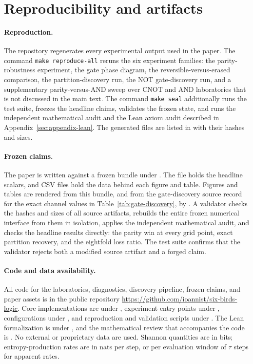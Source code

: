 \appendix
\section{Reproducibility and artifacts}
\label{sec:appendix}

\paragraph{Reproduction.}
The repository regenerates every experimental output used in the paper. The command \texttt{make reproduce-all} reruns the six experiment families: the parity-robustness experiment, the gate phase diagram, the reversible-versus-erased comparison, the partition-discovery run, the NOT gate-discovery run, and a supplementary parity-versus-AND sweep over CNOT and AND laboratories that is not discussed in the main text. The command \texttt{make seal} additionally runs the test suite, freezes the headline claims, validates the frozen state, and runs the independent mathematical audit and the Lean axiom audit described in Appendix~\ref{sec:appendix-lean}. The generated files are listed in  with their hashes and sizes.

\paragraph{Frozen claims.}
The paper is written against a frozen bundle under . The file  holds the headline scalars, and CSV files hold the data behind each figure and table. Figures and tables are rendered from this bundle, and from the gate-discovery source record for the exact channel values in Table~\ref{tab:gate-discovery}, by . A validator checks the hashes and sizes of all source artifacts, rebuilds the entire frozen numerical interface from them in isolation, applies the independent mathematical audit, and checks the headline results directly: the parity win at every grid point, exact partition recovery, and the eightfold loss ratio. The test suite confirms that the validator rejects both a modified source artifact and a forged claim.

\paragraph{Code and data availability.}
All code for the laboratories, diagnostics, discovery pipeline, frozen claims, and paper assets is in the public repository \url{https://github.com/ioannist/six-birds-logic}. Core implementations are under , experiment entry points under , configurations under , and reproduction and validation scripts under . The Lean formalization is under , and the mathematical review that accompanies the code is . No external or proprietary data are used. Shannon quantities are in bits; entropy-production rates are in nats per step, or per evaluation window of \(\tau\) steps for apparent rates.

